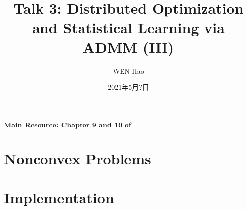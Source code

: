 


\title{Talk 3: Distributed Optimization and Statistical Learning via ADMM (III)}
\date{2021年5月?日}
\author{WEN Hao}

\maketitle

{\bfseries Main Resource: Chapter 9 and 10 of \cite{boyd2011distributed}}

\section{Nonconvex Problems}

\section{Implementation}






